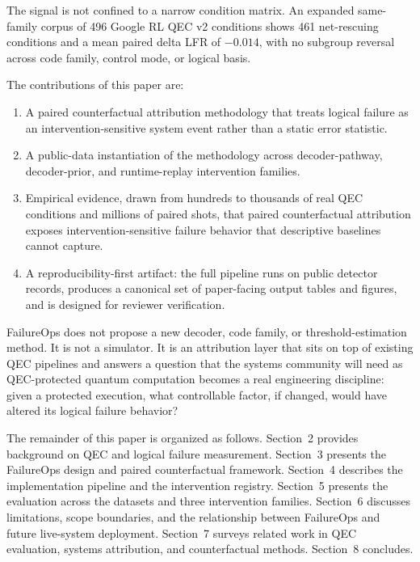 The signal is not confined to a narrow condition matrix. An expanded same-family corpus of 496 Google RL QEC v2 conditions shows 461 net-rescuing conditions and a mean paired delta LFR of $-0.014$, with no subgroup reversal across code family, control mode, or logical basis.

The contributions of this paper are:
\begin{enumerate}
\item A paired counterfactual attribution methodology that treats logical failure as an intervention-sensitive system event rather than a static error statistic.
\item A public-data instantiation of the methodology across decoder-pathway, decoder-prior, and runtime-replay intervention families.
\item Empirical evidence, drawn from hundreds to thousands of real QEC conditions and millions of paired shots, that paired counterfactual attribution exposes intervention-sensitive failure behavior that descriptive baselines cannot capture.
\item A reproducibility-first artifact: the full pipeline runs on public detector records, produces a canonical set of paper-facing output tables and figures, and is designed for reviewer verification.
\end{enumerate}

FailureOps does not propose a new decoder, code family, or threshold-estimation method. It is not a simulator. It is an attribution layer that sits on top of existing QEC pipelines and answers a question that the systems community will need as QEC-protected quantum computation becomes a real engineering discipline: given a protected execution, what controllable factor, if changed, would have altered its logical failure behavior?

The remainder of this paper is organized as follows. Section~2 provides background on QEC and logical failure measurement. Section~3 presents the FailureOps design and paired counterfactual framework. Section~4 describes the implementation pipeline and the intervention registry. Section~5 presents the evaluation across the datasets and three intervention families. Section~6 discusses limitations, scope boundaries, and the relationship between FailureOps and future live-system deployment. Section~7 surveys related work in QEC evaluation, systems attribution, and counterfactual methods. Section~8 concludes.
